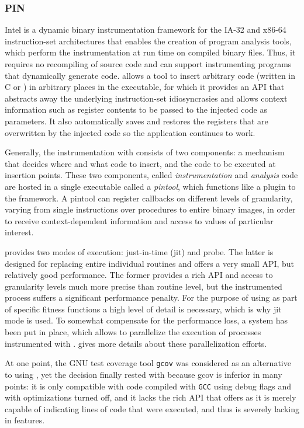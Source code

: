 \subsubsection{PIN}
{\small Intel} \pin\cite{Luk05pin:building} is a dynamic binary instrumentation framework for the IA-32 and x86-64 instruction-set architectures 
that enables the creation of program analysis tools, which perform the instrumentation at run time on  
compiled binary files. Thus, it requires no recompiling of source code and can support instrumenting programs that dynamically generate code.
\pin allows a tool to insert arbitrary code (written in {\small C} or \cpp) in arbitrary places in the executable, for which it 
provides an API that abstracts away the underlying instruction-set idiosyncrasies and allows context information 
such as register contents to be passed to the injected code as parameters. It also automatically saves and restores 
the registers that are overwritten by the injected code so the application continues to work.

Generally, the instrumentation with \pin consists of two components: a mechanism that decides where and what code to insert, 
and the code to be executed at insertion points. These two components, called \emph{instrumentation} and \emph{analysis} 
code are hosted in a single executable called a \emph{pintool}, which functions like a plugin to the \pin framework.
A pintool can register callbacks on different levels of granularity, varying from single instructions over procedures
to entire binary images, in order to receive context-dependent information and access to values of particular interest.

\pin provides two modes of execution: just-in-time (jit) and probe. The latter is designed for replacing
entire individual routines and offers a very small API, but relatively good performance. The former provides
a rich API and access to granularity levels much more precise than routine level, but the instrumented process
suffers a significant performance penalty. For the purpose of using \pin as part of specific fitness functions
a high level of detail is necessary, which is why jit mode is used. To somewhat compensate for the performance
loss, a system has been put in place, which allows to parallelize the execution of processes instrumented with
\pin.  gives more details about these parallelization efforts.

At one point, the GNU test coverage tool \texttt{gcov}\cite{gcov} was considered as an alternative to using
\pin, yet the decision finally rested with \pin because gcov is inferior in many points: it is only
compatible with code compiled with \texttt{GCC} using debug flags and with optimizations turned off, and it
lacks the rich API that \pin offers as it is merely capable of indicating lines of code that were executed, and
thus is severely lacking in features.

